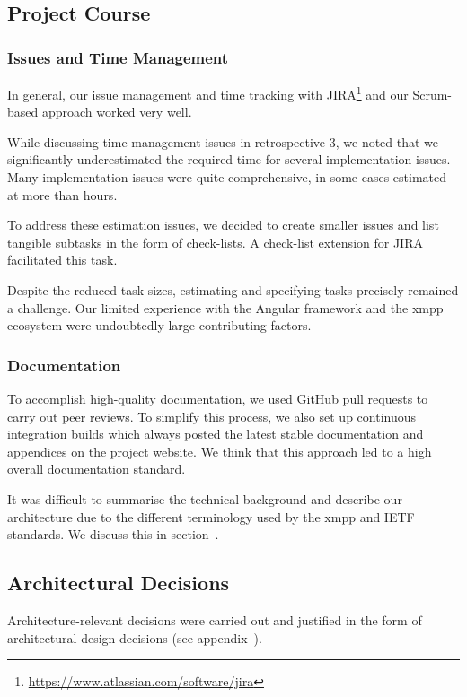 \subsection{Project Course}

\subsubsection{Issues and Time Management}

In general, our issue management and time tracking with JIRA\footnote{\url{https://www.atlassian.com/software/jira}} and our Scrum-based approach worked very well.

While discussing time management issues in retrospective 3, we noted that we significantly underestimated the required time for several implementation issues.
Many implementation issues were quite comprehensive, in some cases estimated at more than hours.

To address these estimation issues, we decided to create smaller issues and list tangible subtasks in the form of check-lists.
A check-list extension for JIRA facilitated this task.

Despite the reduced task sizes, estimating and specifying tasks precisely remained a challenge.
Our limited experience with the Angular framework and the \gls{xmpp} ecosystem were undoubtedly large contributing factors.

\subsubsection{Documentation}

To accomplish high-quality documentation, we used GitHub pull requests to carry out peer reviews.
To simplify this process, we also set up continuous integration builds which always posted the latest stable documentation and appendices on the project website.
We think that this approach led to a high overall documentation standard.

It was difficult to summarise the technical background and describe our architecture due to the different terminology used by the \gls{xmpp} and IETF standards.
We discuss this in section~.

\subsection{Architectural Decisions}

Architecture-relevant decisions were carried out and justified in the form of architectural design decisions \cite{architectural-design-decisions} (see appendix~).

